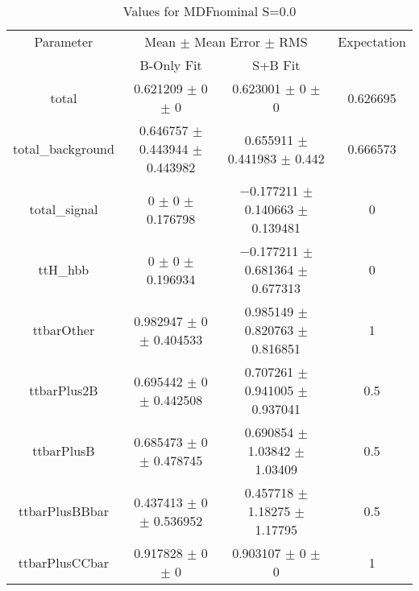 \begin{table}
\centering
\caption{Values for MDFnominal S=0.0}
\begin{tabular}{cccc}
\toprule
Parameter & \multicolumn{2}{c}{Mean $\pm$ Mean Error $\pm$ RMS} & Expectation\\
 & B-Only Fit & S+B Fit & \\
\midrule
total & \num{0.621209} $\pm$ \num{0} $\pm$ \num{0} & \num{0.623001} $\pm$ \num{0} $\pm$ \num{0} & \num{0.626695}\\
total\_background & \num{0.646757} $\pm$ \num{0.443944} $\pm$ \num{0.443982} & \num{0.655911} $\pm$ \num{0.441983} $\pm$ \num{0.442} & \num{0.666573}\\
total\_signal & \num{0} $\pm$ \num{0} $\pm$ \num{0.176798} & \num{-0.177211} $\pm$ \num{0.140663} $\pm$ \num{0.139481} & \num{0}\\
ttH\_hbb & \num{0} $\pm$ \num{0} $\pm$ \num{0.196934} & \num{-0.177211} $\pm$ \num{0.681364} $\pm$ \num{0.677313} & \num{0}\\
ttbarOther & \num{0.982947} $\pm$ \num{0} $\pm$ \num{0.404533} & \num{0.985149} $\pm$ \num{0.820763} $\pm$ \num{0.816851} & \num{1}\\
ttbarPlus2B & \num{0.695442} $\pm$ \num{0} $\pm$ \num{0.442508} & \num{0.707261} $\pm$ \num{0.941005} $\pm$ \num{0.937041} & \num{0.5}\\
ttbarPlusB & \num{0.685473} $\pm$ \num{0} $\pm$ \num{0.478745} & \num{0.690854} $\pm$ \num{1.03842} $\pm$ \num{1.03409} & \num{0.5}\\
ttbarPlusBBbar & \num{0.437413} $\pm$ \num{0} $\pm$ \num{0.536952} & \num{0.457718} $\pm$ \num{1.18275} $\pm$ \num{1.17795} & \num{0.5}\\
ttbarPlusCCbar & \num{0.917828} $\pm$ \num{0} $\pm$ \num{0} & \num{0.903107} $\pm$ \num{0} $\pm$ \num{0} & \num{1}\\
\bottomrule
\end{tabular}
\end{table}